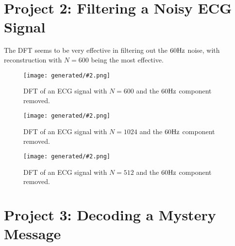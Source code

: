\documentclass{ajhlabreport}
\newcommand{\generatedfigw}[2]{
	\texttt{[image: generated/\#2.png]}
}
\begin{document}
\newpage
\chapter{Project 2: Filtering a Noisy ECG Signal}

The DFT seems to be very effective in filtering out the $60\hertz$ noise, with
reconstruction with $N=600$ being the most effective.

\begin{figure}[H]
\centering
\generatedfigw{1}{p2-600}
\caption{DFT of an ECG signal with $N=600$ and the $60\hertz$ component removed.}
\end{figure}

\begin{figure}[H]
\centering
\generatedfigw{1}{p2-1024}
\caption{DFT of an ECG signal with $N=1024$ and the $60\hertz$ component removed.}
\end{figure}

\begin{figure}[H]
\centering
\generatedfigw{1}{p2-512}
\caption{DFT of an ECG signal with $N=512$ and the $60\hertz$ component removed.}
\end{figure}


\newcommand{\answermark}[1]{\textbf{(#1)}}

\newpage
\chapter{Project 3: Decoding a Mystery Message}
\end{document}
